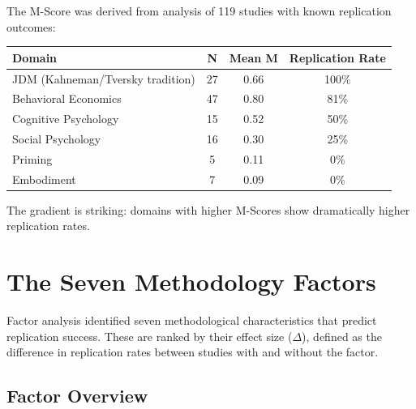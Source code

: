 \documentclass[11pt,a4paper]{article}
\begin{document}
\begin{empiricalbox}[title={Dataset: N = 119 Studies}]
The M-Score was derived from analysis of 119 studies with known replication outcomes:

\begin{center}
\begin{tabular}{lccc}
\toprule
\textbf{Domain} & \textbf{N} & \textbf{Mean M} & \textbf{Replication Rate} \\
\midrule
JDM (Kahneman/Tversky tradition) & 27 & 0.66 & 100\% \\
Behavioral Economics & 47 & 0.80 & 81\% \\
Cognitive Psychology & 15 & 0.52 & 50\% \\
Social Psychology & 16 & 0.30 & 25\% \\
Priming & 5 & 0.11 & 0\% \\
Embodiment & 7 & 0.09 & 0\% \\
\bottomrule
\end{tabular}
\end{center}

The gradient is striking: domains with higher M-Scores show dramatically higher replication rates.
\end{empiricalbox}


\section{The Seven Methodology Factors}
\label{sec:factors}

Factor analysis identified seven methodological characteristics that predict replication success. These are ranked by their effect size ($\Delta$), defined as the difference in replication rates between studies with and without the factor.

\subsection{Factor Overview}
\end{document}
